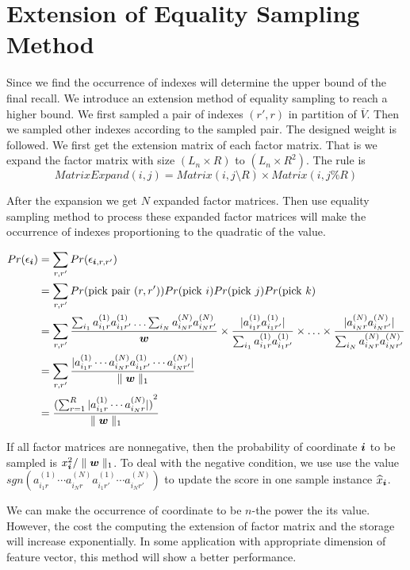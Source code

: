 \documentclass{article}
\newcommand{\Sca}[3]{{#1}^{(#2)}_{i_#2#3}}%
\newcommand{\V}[1]{{\bm{{\MakeLowercase{#1}}}}}%
\newcommand{\norm}[2]{\parallel#1\parallel_{#2}}
\begin{document}
\section{Extension of Equality Sampling Method}

Since we find the occurrence of indexes will determine the upper bound of the final recall. We introduce an extension method of equality sampling to reach a higher bound. We first sampled a pair of indexes $(r',r)$ in partition of $\overline{V}$. Then we sampled other indexes according to the sampled pair. The designed weight is followed. We first get the extension matrix of each factor matrix. That is we expand the factor matrix with size $(L_n \times R)$ to $(L_n \times R^2)$. The rule is 
\[
MatrixExpand(i,j) = Matrix(i,j \setminus R)\times Matrix(i,j\%R)
\]

After the expansion we get $N$ expanded factor matrices. Then use equality sampling method to process these expanded factor matrices will make the occurrence of indexes proportioning to the 
quadratic of the value.

\begin{align*}
Pr(\epsilon_{\V{i}}) &= \sum_{r,r'} Pr(\epsilon_{\V{i},r,r'})\\
&= \sum_{r,r'} Pr({\rm pick\ pair\ }(r,r'))Pr({\rm pick\ }i)Pr({\rm pick\ }j)Pr({\rm pick\ }k)\\
&= \sum_{r,r'} \frac{\sum_{i_1}{\Sca{a}{1}{r}\Sca{a}{1}{r'}}\ldots\sum_{i_N}{\Sca{a}{N}{r}\Sca{a}{N}{r'}}}{\V{w}}\times 
\frac{|\Sca{a}{1}{r}\Sca{a}{1}{r'}|}{\sum_{i_1}{\Sca{a}{1}{r}\Sca{a}{1}{r'}}} \times\ldots\times 
\frac{|\Sca{a}{N}{r}\Sca{a}{N}{r'}|}{\sum_{i_N}{\Sca{a}{N}{r}\Sca{a}{N}{r'}}} \\
& = \sum_{r,r'} \frac{|\Sca{a}{1}{r}\cdots\Sca{a}{N}{r}\Sca{a}{1}{r'}\cdots\Sca{a}{N}{r'}|}{\norm{\V{W}}{1}}\\
& = \frac{{(\sum_{r=1}^{R} |\Sca{a}{1}{r}\cdots\Sca{a}{N}{r}|)}^2}{\norm{\V{W}}{1}}
\end{align*}

If all factor matrices are nonnegative, then the probability of coordinate $\V{i}$ to be sampled is $x_{\V{i}}^2/\norm{\V{w}}{1}$. 
To deal with the negative condition, we use use the value $sgn(\Sca{a}{1}{r}\cdots\Sca{a}{N}{r}\Sca{a}{1}{r'}\cdots\Sca{a}{N}{r'})$ 
to update the score in one sample instance $\widehat{x}_{\V{i}}$.

We can make the occurrence of coordinate to be $n$-the power the its value. However, the cost the computing the extension of factor matrix and the storage will increase exponentially. In 
some application with appropriate dimension of feature vector, this method will show a better performance.
\end{document}

